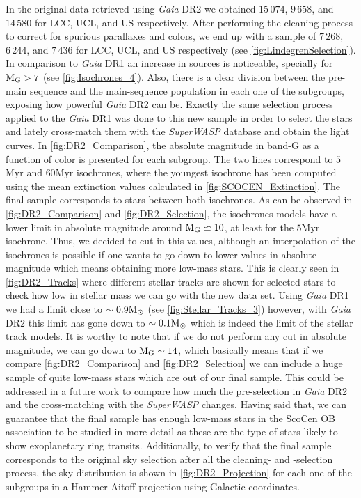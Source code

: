 In the original data retrieved using \textit{Gaia} DR2 we obtained $15\,074$, $9\,658$, and $14\,580$ for LCC, UCL, and US respectively. After performing the cleaning process to correct for spurious parallaxes and colors, we end up with a sample of $7\,268$, $6\,244$, and $7\,436$ for LCC, UCL, and US respectively (see \autoref{fig:LindegrenSelection}). In comparison to \textit{Gaia} DR1 an increase in sources is noticeable, specially for $\textnormal{M}_\textnormal{G} > 7$ (see \autoref{fig:Isochrones_4}). Also, there is a clear division between the pre-main sequence and the main-sequence population in each one of the subgroups, exposing how powerful \textit{Gaia} DR2 can be. Exactly the same selection process applied to the \textit{Gaia} DR1 was done to this new sample in order to select the stars and lately cross-match them with the \textit{SuperWASP} database and obtain the light curves. In \autoref{fig:DR2_Comparison}, the absolute magnitude in band-G as a function of color is presented for each subgroup. The two lines correspond to $5$Myr and $60$Myr isochrones, where the youngest isochrone has been computed using the mean extinction values calculated in \autoref{fig:SCOCEN_Extinction}. The final sample corresponds to stars between both isochrones. As can be observed in \autoref{fig:DR2_Comparison} and \autoref{fig:DR2_Selection}, the isochrones models have a lower limit in absolute magnitude around $\textnormal{M}_\textnormal{G} \backsimeq 10$, at least for the $5$Myr isochrone. Thus, we decided to cut in this values, although an interpolation of the isochrones is possible if one wants to go down to lower values in absolute magnitude which means obtaining more low-mass stars. This is clearly seen in \autoref{fig:DR2_Tracks} where different stellar tracks are shown for selected stars to check how low in stellar mass we can go with the new data set. Using \textit{Gaia} DR1 we had a limit close to $\sim0.9\textnormal{M}_\odot$ (see \autoref{fig:Stellar_Tracks_3}) however, with \textit{Gaia} DR2   this limit has gone down to $\sim0.1\textnormal{M}_\odot$ which is indeed the limit of the stellar track models. It is worthy to note that if we do not perform any cut in absolute magnitude, we can go down to $\textnormal{M}_\textnormal{G}\sim14$, which basically means that if we compare \autoref{fig:DR2_Comparison} and \autoref{fig:DR2_Selection} we can include a huge sample of quite low-mass stars which are out of our final sample. This could be addressed in a future work to compare how much the pre-selection in \textit{Gaia} DR2 and the cross-matching with the \textit{SuperWASP} changes. Having said that, we can guarantee that the final sample has enough low-mass stars in the ScoCen OB association to be studied in more detail as these are the type of stars likely to show exoplanetary ring transits. Additionally, to verify that the final sample corresponds to the original sky selection after all the cleaning- and -selection process, the sky distribution is shown in \autoref{fig:DR2_Projection} for each one of the subgroups in a Hammer-Aitoff projection using Galactic coordinates.     

